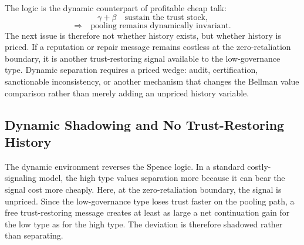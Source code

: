 \documentclass[preprint,authoryear]{elsarticle}
\theoremstyle{definition}
\theoremstyle{plain}
\begin{document}
The logic is the dynamic counterpart of profitable cheap talk:
\[
\gamma+\beta
\quad\text{sustain the trust stock,}
\]
\[
\Rightarrow\quad
\text{pooling remains dynamically invariant.}
\]
The next issue is therefore not whether history exists, but whether history is
priced.  If a reputation or repair message remains costless at the
zero-retaliation boundary, it is another trust-restoring signal available to
the low-governance type.  Dynamic separation requires a priced wedge: audit,
certification, sanctionable inconsistency, or another mechanism that changes
the Bellman value comparison rather than merely adding an unpriced history
variable.

\subsection{Dynamic Shadowing and No Trust-Restoring History}
\label{subsec:dynamic-shadowing}

The dynamic environment reverses the Spence logic.  In a standard
costly-signaling model, the high type values separation more because it can
bear the signal cost more cheaply.  Here, at the zero-retaliation boundary, the
signal is unpriced.  Since the low-governance type loses trust faster on the
pooling path, a free trust-restoring message creates at least as large a net
continuation gain for the low type as for the high type.  The deviation is
therefore shadowed rather than separating.
\end{document}
